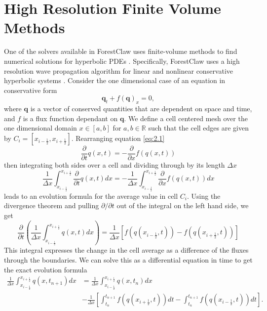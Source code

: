 \documentclass[twoside]{bsu-ms}
\newcommand{\fclaw}{ForestClaw\xspace}
\begin{document}
\section{High Resolution Finite Volume Methods}\label{sec:2.1}
One of the solvers available in \fclaw uses finite-volume methods to find numerical solutions for hyperbolic PDEs \cite{leveque2002finite}. Specifically, \fclaw uses a high resolution wave propagation algorithm for linear and nonlinear conservative hyperbolic systems \cite{leveque1997wave}. Consider the one dimensional case of an equation in conservative form
\begin{equation}\label{eq:2.1}
    \mathbf{q}_{t}+f(\mathbf{q})_{x}=0,
\end{equation}
where $\mathbf{q}$ is a vector of conserved quantities that are dependent on space and time, and $f$ is a flux function dependant on $\mathbf{q}$. We define a cell centered mesh over the one dimensional domain $x\in\left[a,b\right]$ for $a,b\in\mathbb{R}$ such that the cell edges are given by $C_{i}=\left[x_{i-\frac{1}{2}},x_{i+\frac{1}{2}}\right]$. 
Rearranging equation \eqref{eq:2.1}
\begin{equation*}
    \frac{\partial}{\partial t}q(x,t)=-\frac{\partial}{\partial x}f(q(x,t))
\end{equation*}
then integrating both sides over a cell and dividing through by its length $\Delta x$
\begin{equation}\label{eq:2.2}
    \frac{1}{\Delta x}\int_{x_{i-\frac{1}{2}}}^{x_{i+\frac{1}{2}}}\frac{\partial}{\partial t}q(x,t)dx=-\frac{1}{\Delta x}\int_{x_{i-\frac{1}{2}}}^{x_{i+\frac{1}{2}}}\frac{\partial}{\partial x} f(q(x,t))dx
\end{equation}
leads to an evolution formula for the average value in cell $C_i$. Using the divergence theorem and pulling $\partial /\partial t$ out of the integral on the left hand side, we get
\begin{equation}\label{eq:2.3}
    \frac{\partial}{\partial t}\left(\frac{1}{\Delta x}\int_{x_{i-\frac{1}{2}}}^{x_{i+\frac{1}{2}}}q(x,t)dx\right)=\frac{1}{\Delta x}\left[f\left(q\left(x_{i-\frac{1}{2}},t\right)\right)-f\left(q\left(x_{i+\frac{1}{2}},t\right)\right)\right]
\end{equation} This integral expresses the change in the cell average as a  difference of the fluxes through the boundaries. We can solve this as a differential equation in time to get the exact evolution formula
\begin{equation}\label{eq:2.4}
\begin{aligned}
     \frac{1}{\Delta x}\int_{x_{i-\frac{1}{2}}}^{x_{i+\frac{1}{2}}}q(x,t_{n+1})dx&=\frac{1}{\Delta x}\int_{x_{i-\frac{1}{2}}}^{x_{i+\frac{1}{2}}}q(x,t_{n})dx\\&-\frac{1}{\Delta x}\left[\int_{t_{n}}^{t_{n+1}}f\left(q\left(x_{i+\frac{1}{2}},t\right)\right)dt-\int_{t_{n}}^{t_{n+1}}f\left(q\left(x_{i-\frac{1}{2}},t\right)\right)dt\right].
     \end{aligned}
\end{equation}
\end{document}
